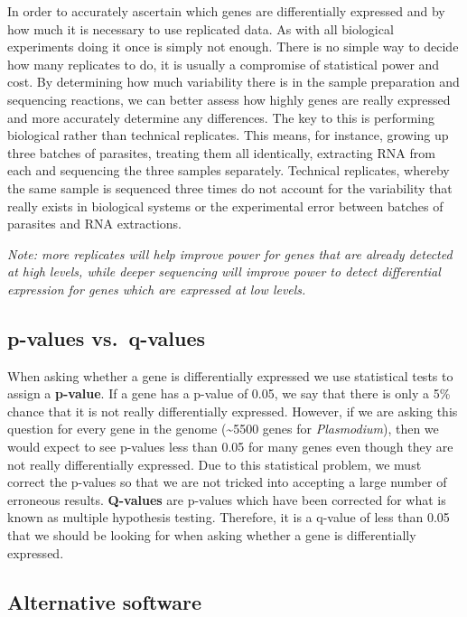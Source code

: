 \documentclass[11pt]{article}
\begin{document}
In order to accurately ascertain which genes are differentially
expressed and by how much it is necessary to use replicated data. As
with all biological experiments doing it once is simply not enough.
There is no simple way to decide how many replicates to do, it is
usually a compromise of statistical power and cost. By determining how
much variability there is in the sample preparation and sequencing
reactions, we can better assess how highly genes are really expressed
and more accurately determine any differences. The key to this is
performing biological rather than technical replicates. This means, for
instance, growing up three batches of parasites, treating them all
identically, extracting RNA from each and sequencing the three samples
separately. Technical replicates, whereby the same sample is sequenced
three times do not account for the variability that really exists in
biological systems or the experimental error between batches of
parasites and RNA extractions.

\textit{Note: more replicates will help improve power for genes that are
already detected at high levels, while deeper sequencing will improve
power to detect differential expression for genes which are expressed at
low levels.}

\hypertarget{p-values-vs.-q-values}{%
\subsection{p-values vs.~q-values}\label{p-values-vs.-q-values}}

When asking whether a gene is differentially expressed we use
statistical tests to assign a \textbf{p-value}. If a gene has a p-value
of 0.05, we say that there is only a 5\% chance that it is not really
differentially expressed. However, if we are asking this question for
every gene in the genome (\textasciitilde5500 genes for
\textit{Plasmodium}), then we would expect to see p-values less than 0.05
for many genes even though they are not really differentially expressed.
Due to this statistical problem, we must correct the p-values so that we
are not tricked into accepting a large number of erroneous results.
\textbf{Q-values} are p-values which have been corrected for what is
known as multiple hypothesis testing. Therefore, it is a q-value of less
than 0.05 that we should be looking for when asking whether a gene is
differentially expressed.

\hypertarget{alternative-software}{%
\subsection{Alternative software}\label{alternative-software}}
\end{document}
